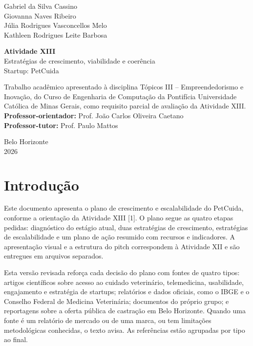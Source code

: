 \documentclass[12pt,a4paper]{article}
\begin{document}
\begin{titlepage}
\thispagestyle{empty}
\begin{center}
{\large Gabriel da Silva Cassino}\\
{\large Giovanna Naves Ribeiro}\\
{\large Júlia Rodrigues Vasconcellos Melo}\\
{\large Kathleen Rodrigues Leite Barbosa}

\vfill
{\Large\textbf{Atividade XIII}}\\[0.25cm]
{\large Estratégias de crescimento, viabilidade e coerência}\\[0.25cm]
{\large Startup: PetCuida}
\end{center}
\vfill
\begin{flushright}
\begin{minipage}{8.2cm}
\small\singlespacing
Trabalho acadêmico apresentado à disciplina Tópicos III -- Empreendedorismo e Inovação, do Curso de Engenharia de Computação da Pontifícia Universidade Católica de Minas Gerais, como requisito parcial de avaliação da Atividade XIII.\\[0.35cm]
\textbf{Professor-orientador:} Prof. João Carlos Oliveira Caetano\\
\textbf{Professor-tutor:} Prof. Paulo Mattos
\end{minipage}
\end{flushright}
\vfill
\begin{center}Belo Horizonte\\2026\end{center}
\end{titlepage}

\tableofcontents
\clearpage
{}

\section{Introdução}

Este documento apresenta o plano de crescimento e escalabilidade do PetCuida, conforme a orientação da Atividade XIII [1]. O plano segue as quatro etapas pedidas: diagnóstico do estágio atual, duas estratégias de crescimento, estratégias de escalabilidade e um plano de ação resumido com recursos e indicadores. A apresentação visual e a estrutura do pitch correspondem à Atividade XII e são entregues em arquivos separados.

Esta versão revisada reforça cada decisão do plano com fontes de quatro tipos: artigos científicos sobre acesso ao cuidado veterinário, telemedicina, usabilidade, engajamento e estratégia de startups; relatórios e dados oficiais, como o IBGE e o Conselho Federal de Medicina Veterinária; documentos do próprio grupo; e reportagens sobre a oferta pública de castração em Belo Horizonte. Quando uma fonte é um relatório de mercado ou de uma marca, ou tem limitações metodológicas conhecidas, o texto avisa. As referências estão agrupadas por tipo ao final.
\end{document}
